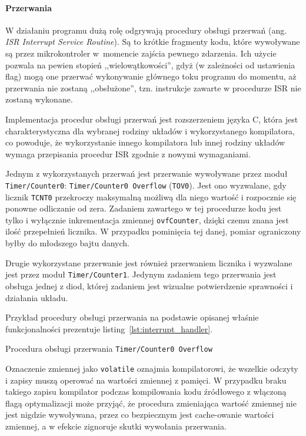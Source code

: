 \paragraph{Przerwania}
W działaniu programu dużą rolę odgrywają procedury obsługi przerwań (ang. \textsl{ISR \ppauza Interrupt Service Routine}). Są to krótkie fragmenty kodu, które wywoływane są przez mikrokontroler w~momencie zajścia pewnego zdarzenia. Ich użycie pozwala na pewien stopień ,,wielowątkowości'', gdyż (w zależności od ustawienia flag) mogą one przerwać wykonywanie głównego toku programu do momentu, aż przerwania nie zostaną ,,obsłużone'', tzn. instrukcje zawarte w procedurze ISR nie zostaną wykonane.

Implementacja procedur obsługi przerwań jest rozszerzeniem języka C, która jest charakterystyczna dla wybranej rodziny układów i wykorzystanego kompilatora, co powoduje, że wykorzystanie innego kompilatora lub innej rodziny układów wymaga przepisania procedur ISR zgodnie z nowymi wymaganiami.

Jednym z wykorzystanych przerwań jest przerwanie wywoływane przez moduł \texttt{Timer/Counter0}: \texttt{Timer/Counter0 Overflow} (\texttt{TOV0}). Jest ono wyzwalane, gdy licznik \texttt{TCNT0} przekroczy maksymalną możliwą dla niego wartość i rozpocznie się ponowne odliczanie od zera. Zadaniem zawartego w tej procedurze kodu jest tylko i wyłącznie inkrementacja zmiennej \texttt{ovfCounter}, dzięki czemu znana jest ilość przepełnień licznika. W przypadku pominięcia tej danej, pomiar ograniczony byłby do młodszego bajtu danych.

Drugie wykorzystane przerwanie jest również przerwaniem licznika i wyzwalane jest przez moduł \texttt{Timer/Counter1}. Jedynym zadaniem tego przerwania jest obsługa jednej z diod, której zadaniem jest wizualne potwierdzenie sprawności i działania układu.

Przykład procedury obsługi przerwania na podstawie opisanej właśnie funkcjonalności prezentuje listing~\ref{lst:interrupt_handler}.

\begin{listing}
  
  \caption{Procedura obsługi przerwania \texttt{Timer/Counter0 Overflow}}
  \label{lst:interrupt_handler}
\end{listing}

Oznaczenie zmiennej jako \texttt{volatile} oznajmia kompilatorowi, że wszelkie odczyty i zapisy muszą operować na wartości zmiennej z pamięci. W przypadku braku takiego zapisu kompilator podczas kompilowania kodu źródłowego z włączoną flagą optymalizacji może przyjąć, że procedura zmieniająca wartość zmiennej nie jest nigdzie wywoływana, przez co bezpiecznym jest cache-owanie wartości zmiennej, a w efekcie zignoruje skutki wywołania przerwania.

